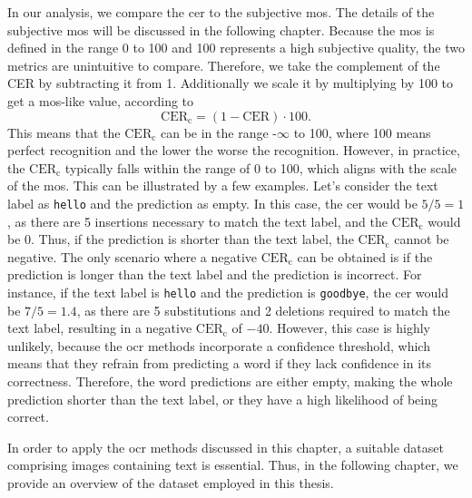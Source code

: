 In our analysis, we compare the \gls{cer} to the subjective \gls{mos}.
The details of the subjective \gls{mos} will be discussed in the following chapter.
Because the \gls{mos} is defined in the range 0 to 100 and 100 represents a high subjective quality, the two metrics are unintuitive to compare.
Therefore, we take the complement of the CER by subtracting it from 1.
Additionally we scale it by multiplying by 100 to get a \gls{mos}-like value, according to
\begin{equation}
    \text{CER}_{\text{c}} = (1 - \text{CER}) \cdot 100.
    \label{eq:cer2mos}
\end{equation}
This means that the $\text{CER}_{\text{c}}$ can be in the range -$\infty$ to 100, where 100 means perfect recognition and the lower the worse the recognition.
However, in practice, the $\text{CER}_{\text{c}}$ typically falls within the range of 0 to 100, which aligns with the scale of the \gls{mos}.
This can be illustrated by a few examples.
Let's consider the text label as \texttt{hello} and the prediction as empty.
In this case, the \gls{cer} would be $5/5 = 1$, as there are 5 insertions necessary to match the text label, and the $\text{CER}_{\text{c}}$ would be $0$.
Thus, if the prediction is shorter than the text label, the $\text{CER}_{\text{c}}$ cannot be negative.
The only scenario where a negative $\text{CER}_{\text{c}}$ can be obtained is if the prediction is longer than the text label and the prediction is incorrect.
For instance, if the text label is \texttt{hello} and the prediction is \texttt{goodbye}, the \gls{cer} would be $7/5 = 1.4$, as there are 5 substitutions and 2 deletions required to match the text label, resulting in a negative $\text{CER}_{\text{c}}$ of $-40$.
However, this case is highly unlikely, because the \gls{ocr} methods incorporate a confidence threshold, which means that they refrain from predicting a word if they lack confidence in its correctness.
Therefore, the word predictions are either empty, making the whole prediction shorter than the text label, or they have a high likelihood of being correct.

In order to apply the \gls{ocr} methods discussed in this chapter, a suitable dataset comprising images containing text is essential.
Thus, in the following chapter, we provide an overview of the dataset employed in this thesis.
